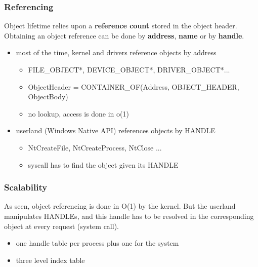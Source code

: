 
\begin{frame}
  \frametitle{Referencing}

  Object lifetime relies upon a \textbf{reference count} stored in the object header.
  Obtaining an object reference can be done by \textbf{address}, \textbf{name} or by
  \textbf{handle}.

  \begin{itemize}
    \item
      most of the time, kernel and drivers reference objects by address

      \begin{itemize}
        \item
          FILE\_OBJECT*, DEVICE\_OBJECT*, DRIVER\_OBJECT*...
        \item
          ObjectHeader = CONTAINER\_OF(Address, OBJECT\_HEADER, ObjectBody)
        \item
          no lookup, access is done in o(1)
      \end{itemize}

    \item
      userland (Windows Native API) references objects by HANDLE
      \begin{itemize}
        \item
          NtCreateFile, NtCreateProcess, NtClose ...
        \item
          syscall has to find the object given its HANDLE
      \end{itemize}
  \end{itemize}

\end{frame}



\begin{frame}
  \frametitle{Scalability}

  As seen, object referencing is done in O(1) by the kernel. But the
  userland manipulates HANDLEs, and this handle has to be resolved in
  the corresponding object at every request (system call).

  \begin{itemize}
    \item
       one handle table per process plus one for the system
    \item
      three level index table
  \end{itemize}
\end{frame}


